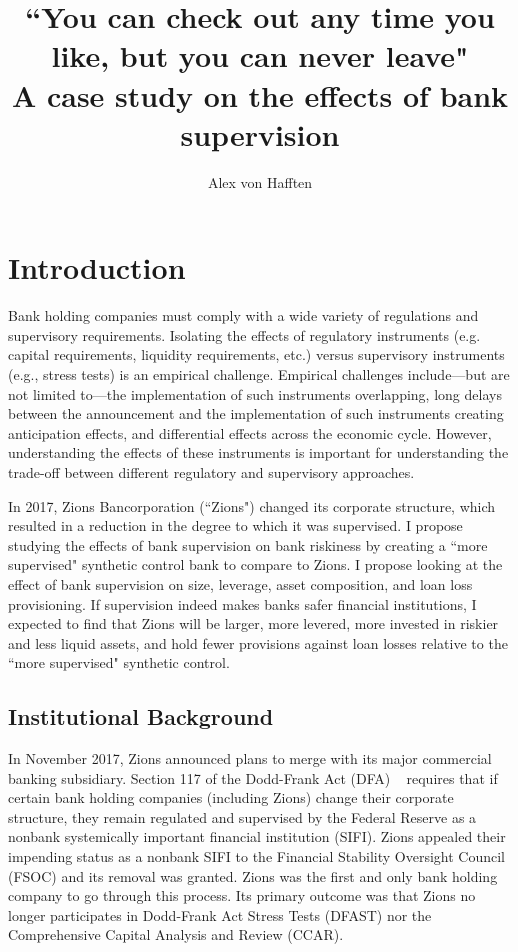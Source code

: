 \documentclass[12pt]{article}
\title{\Large ``You can check out any time you like, but you can never leave" \\ A case study on the effects of bank supervision}
\author{Alex von Hafften}
\begin{document}
\maketitle

\doublespacing

\section{Introduction}

Bank holding companies must comply with a wide variety of regulations and supervisory requirements. Isolating the effects of regulatory instruments (e.g. capital requirements, liquidity requirements, etc.) versus supervisory instruments (e.g., stress tests) is an empirical challenge.  Empirical challenges include---but are not limited to---the implementation of such instruments overlapping, long delays between the announcement and the implementation of such instruments creating anticipation effects, and differential effects across the economic cycle.  However, understanding the effects of these instruments is important for understanding the trade-off between different regulatory and supervisory approaches.

In 2017, Zions Bancorporation (``Zions") changed its corporate structure, which resulted in a reduction in the degree to which it was supervised. I propose studying the effects of bank supervision on bank riskiness by creating a ``more supervised" synthetic control bank to compare to Zions. I propose looking at the effect of bank supervision on size, leverage, asset composition, and loan loss provisioning. If supervision indeed makes banks safer financial institutions, I expected to find that Zions will be larger, more levered, more invested in riskier and less liquid assets, and hold fewer provisions against loan losses relative to the ``more supervised" synthetic control.

\pagebreak

\subsection{Institutional Background}

In November 2017, Zions announced plans to merge with its major commercial banking subsidiary.  Section 117 of the Dodd-Frank Act (DFA) ~\cite{dfa2010} requires that if certain bank holding companies (including Zions) change their corporate structure, they remain regulated and supervised by the Federal Reserve as a nonbank systemically important financial institution (SIFI). Zions appealed their impending status as a nonbank SIFI to the Financial Stability Oversight Council (FSOC) and its removal was granted. Zions was the first and only bank holding company to go through this process. Its primary outcome was that Zions no longer participates in Dodd-Frank Act Stress Tests (DFAST) nor the Comprehensive Capital Analysis and Review (CCAR).
\end{document}
